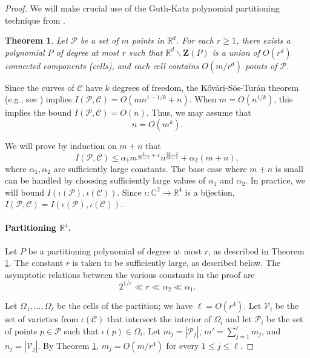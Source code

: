 \documentclass[letterpaper, reqno,11pt]{article}
\newtheorem{theorem}{Theorem}[section]
\theoremstyle{remark}
\newcommand{\RR}{\mathbb{R}}
\newcommand{\CC}{\mathbb{C}}
\newcommand{\BZ}{\mathbf{Z}}
\newcommand{\pts}{\mathcal P}
\newcommand{\vrts}{\mathcal V}
\newcommand{\curves}{\mathcal C}
\begin{document}
\begin{proof}
We will make crucial use of the Guth-Katz polynomial partitioning technique from \cite[Theorem 4.1]{Guth}.
%
\begin{theorem}\label{th:partition}
Let $\pts$ be a set of $m$ points in $\RR^d$. For each $r\geq 1$, there exists a polynomial $P$ of degree at most $r$ such that $\RR^{d}\backslash\BZ(P)$ is a union of $O(r^d)$ connected components (cells), and each cell contains $O(m/r^d)$ points of $\pts$.
\end{theorem}

Since the curves of $\curves$ have $k$ degrees of freedom, the K\H ov\' ari-S\'os-Tur\'an theorem (e.g., see
\cite[Section 4.5]{Mat02}) implies $I(\pts,\curves) = O(mn^{1-1/k} + n)$. When $m=O(n^{1/k})$, this implies the bound $I(\pts,\curves) = O(n)$. Thus, we may assume that
\begin{equation} \label{eq:kst}
n=O\left(m^k\right).
\end{equation}

We will prove by induction on $m+n$ that
\begin{equation*}
I(\pts,\curves) \le \alpha_{1} m^{\frac{k}{2k-1}+\varepsilon}n^{\frac{2k-2}{2k-1}}+\alpha_{2}(m+n),
\end{equation*}
%
where $\alpha_{1},\alpha_{2}$ are sufficiently large constants. The base case where $m+n$ is small can be handled by choosing sufficiently large values of $\alpha_{1}$ and $\alpha_{2}$. In practice, we will bound $I(\iota(\pts),\iota(\curves))$. Since $\iota\colon\CC^2\to\RR^4$ is a bijection, $I(\pts,\curves)=I(\iota(\pts),\iota(\curves))$.

\paragraph{Partitioning $\RR^4$.}
Let $P$ be a partitioning polynomial of degree at most $r$, as described in Theorem \ref{th:partition}.
The constant $r$ is taken to be sufficiently large, as described below.
The asymptotic relations between the various constants in the proof are
%
\begin{equation*}
 2^{1/\varepsilon} \ll r \ll \alpha_{2} \ll \alpha_{1}.
\end{equation*}

Let $\Omega_1, \ldots, \Omega_{\ell}$ be the cells of the partition; we have $\ell=O(r^4)$. Let $\vrts_i$ be the set of varieties from $\iota(\curves)$ that intersect the interior of $\Omega_i$ and let $\pts_i$ be the set of points $p\in\pts$ such that $\iota(p)\in \Omega_i$. Let $m_j=|\pts_j|$, $m' = \sum_{j=1}^{\ell} m_j$, and $n_j=|\vrts_j|$. By Theorem \ref{th:partition}, $m_j=O( m/r^4)$ for every $1\le j \le \ell$.


\end{proof}
\end{document}
